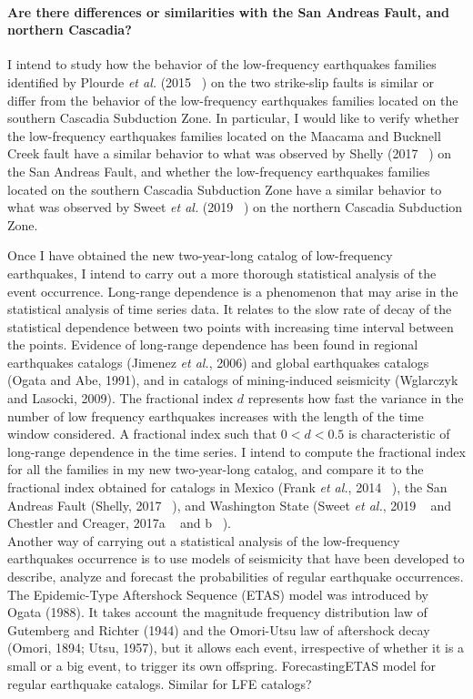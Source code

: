 \documentclass[letterpaper, 12pt]{article}
\begin{document}
\paragraph{Are there differences or similarities with the San Andreas Fault, and northern Cascadia?} I intend to study how the behavior of the low-frequency earthquakes families identified by Plourde \textit{et al.} (2015  ~\cite{PLO_2015}) on the two strike-slip faults is similar or differ from the behavior of the low-frequency earthquakes families located on the southern Cascadia Subduction Zone. In particular, I would like to verify whether the low-frequency earthquakes families located on the Maacama and Bucknell Creek fault have a similar behavior to what was observed by Shelly (2017 ~\cite{SHE_2017}) on the San Andreas Fault, and whether the low-frequency earthquakes families located on the southern Cascadia Subduction Zone have a similar behavior to what was observed by Sweet \textit{et al.} (2019 ~\cite{SWE_2019}) on the northern Cascadia Subduction Zone. 

Once I have obtained the new two-year-long catalog of low-frequency earthquakes, I intend to carry out a more thorough statistical analysis of the event occurrence. Long-range dependence is a phenomenon that may arise in the statistical analysis of time series data. It relates to the slow rate of decay of the statistical dependence between two points with increasing time interval between the points. Evidence of long-range dependence has been found in regional earthquakes catalogs (Jimenez \textit{et al.}, 2006) and global earthquakes catalogs (Ogata and Abe, 1991), and in catalogs of mining-induced seismicity (Wglarczyk and Lasocki, 2009). The fractional index $d$ represents how fast the variance in the number of low frequency earthquakes increases with the length of the time window considered. A fractional index such that $0 < d < 0.5$ is characteristic of long-range dependence in the time series. I intend to compute the fractional index for all the families in my new two-year-long catalog, and compare it to the fractional index obtained for catalogs in Mexico (Frank \textit{et al.}, 2014 ~\cite{FRA_2014}), the San Andreas Fault (Shelly, 2017 ~\cite{SHE_2017}), and Washington State (Sweet \textit{et al.}, 2019 ~\cite{SWE_2019} and Chestler and Creager, 2017a ~\cite{CHE_2017_JGR} and b ~\cite{CHE_2017_G3}). \\

Another way of carrying out a statistical analysis of the low-frequency earthquakes occurrence is to use models of seismicity that have been developed to describe, analyze and forecast the probabilities of regular earthquake occurrences. The Epidemic-Type Aftershock Sequence (ETAS) model was introduced by Ogata (1988). It takes account the magnitude frequency distribution law of Gutemberg and Richter (1944) and the Omori-Utsu law of aftershock decay (Omori, 1894; Utsu, 1957), but it allows each event, irrespective of whether it is a small or a big event, to trigger its own offspring. 
ForecastingETAS model for regular earthquake catalogs. Similar for LFE catalogs?
\end{document}
